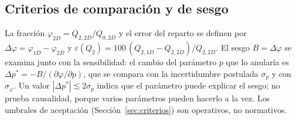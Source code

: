 \subsection{Criterios de comparación y de sesgo}\label{sec:sesgo}
La fracción $\varphi_{2D}=Q_{2,2D}/Q_{0,2D}$ y el error del reparto se definen por $\Delta\varphi=\varphi_{1D}-\varphi_{2D}$ y $\varepsilon(Q_2)=100\,(Q_{2,1D}-Q_{2,2D})/Q_{2,2D}$. El sesgo $B=\Delta\varphi$ se examina junto con la sensibilidad: el cambio del parámetro $p$ que lo anularía es $\Delta p^\ast=-B/(\partial\varphi/\partial p)$, que se compara con la incertidumbre postulada $\sigma_p$ y con $\sigma_\varphi$. Un valor $|\Delta p^\ast|\lesssim2\sigma_p$ indica que el parámetro puede explicar el sesgo; no prueba causalidad, porque varios parámetros pueden hacerlo a la vez. Los umbrales de aceptación (Sección~\ref{sec:criterios}) son operativos, no normativos.

